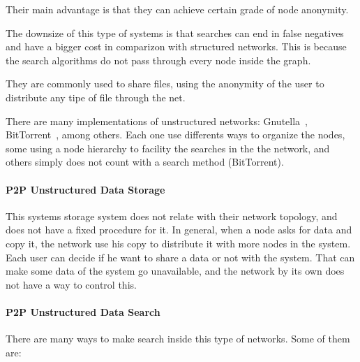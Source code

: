Their main advantage is that they can achieve certain grade of node anonymity.

The downsize of this type of systems is that searches can end in false
negatives and have a bigger cost in comparizon with structured networks. This
is because the search algorithms do not pass through every node inside the
graph.

They are commonly used to share files, using the anonymity of the user to
distribute any tipe of file through the net.

There are many implementations of unstructured networks:
Gnutella~\cite{oai:CiteSeerXPSU:10.1.1.61.7302}, 
BitTorrent~\cite{bittorrent}, 
among others. Each one use differents ways to organize the nodes, some using a
node hierarchy to facility the searches in the the network, and others simply
does not count with a search method (BitTorrent).

\paragraph{P2P Unstructured Data Storage}
\label{sec:p2p_unstructured_storage}

This systems storage system does not relate with their network topology, and
does not have a fixed procedure for it. In general, when a node asks for data
and copy it, the network use his copy to distribute it with more nodes in the
system. Each user can decide if he want to share a data or not with the system.
That can make some data of the system go unavailable, and the network by its
own does not have a way to control this.


\paragraph{P2P Unstructured Data Search}
\label{sec:p2p_unstructured_search}

There are many ways to make search inside this type of networks. Some of them
are:

